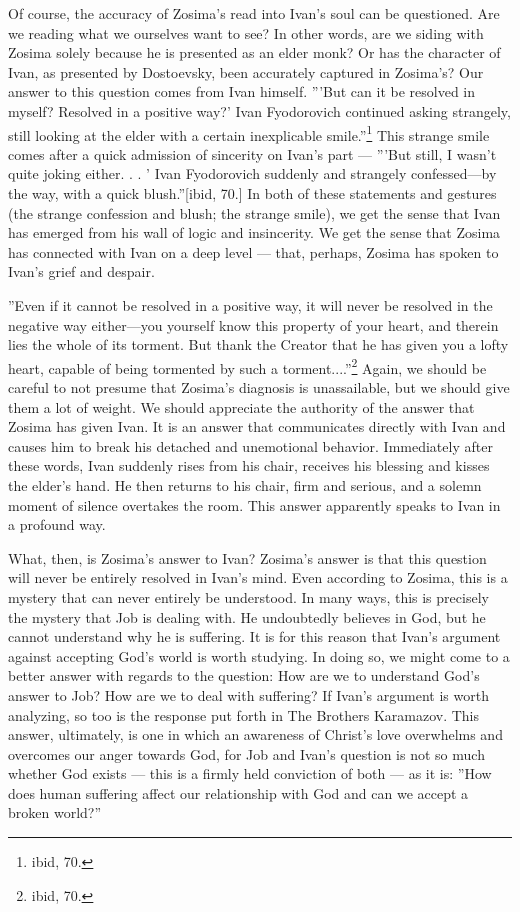 Of course, the accuracy of Zosima's read into Ivan's soul can be questioned. Are we reading what we ourselves want to see? In other words, are we siding with Zosima solely because he is presented as an elder monk? Or has the character of Ivan, as presented by Dostoevsky, been accurately captured in Zosima's? Our answer to this question comes from Ivan himself. '''But can it be resolved in myself? Resolved in a positive way?' Ivan Fyodorovich continued asking strangely, still looking at the elder with a certain inexplicable smile.''\footnote{ibid, 70.} This strange smile comes after a quick admission of sincerity on Ivan's part --- '''But still, I wasn't quite joking either. . . ' Ivan Fyodorovich suddenly and strangely confessed---by the way, with a quick blush.''[ibid, 70.] In both of these statements and gestures (the strange confession and blush; the strange smile), we get the sense that Ivan has emerged from his wall of logic and insincerity. We get the sense that Zosima has connected with Ivan on a deep level --- that, perhaps, Zosima has spoken to Ivan's grief and despair.

''Even if it cannot be resolved in a positive way, it will never be resolved in the negative way either---you yourself know this property of your heart, and therein lies the whole of its torment. But thank the Creator that he has given you a lofty heart, capable of being tormented by such a torment....''\footnote{ibid, 70.} Again, we should be careful to not presume that Zosima's diagnosis is unassailable, but we should give them a lot of weight. We should appreciate the authority of the answer that Zosima has given Ivan. It is an answer that communicates directly with Ivan and causes him to break his detached and unemotional behavior. Immediately after these words, Ivan suddenly rises from his chair, receives his blessing and kisses the elder's hand. He then returns to his chair, firm and serious, and a solemn moment of silence overtakes the room. This answer apparently speaks to Ivan in a profound way.

What, then, is Zosima's answer to Ivan? Zosima's answer is that this question will never be entirely resolved in Ivan's mind. Even according to Zosima, this is a mystery that can never entirely be understood. In many ways, this is precisely the mystery that Job is dealing with. He undoubtedly believes in God, but he cannot understand why he is suffering. It is for this reason that Ivan's argument against accepting God's world is worth studying. In doing so, we might come to a better answer with regards to the question: How are we to understand God's answer to Job? How are we to deal with suffering? If Ivan's argument is worth analyzing, so too is the response put forth in The Brothers Karamazov. This answer, ultimately, is one in which an awareness of Christ's love overwhelms and overcomes our anger towards God, for Job and Ivan's question is not so much whether God exists --- this is a firmly held conviction of both --- as it is: ''How does human suffering affect our relationship with God and can we accept a broken world?''        

